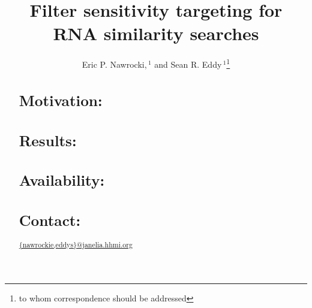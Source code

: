 \documentclass{bioinfo}
\begin{document}

\title[Filter sensitivity targeting]{Filter sensitivity targeting
  for RNA similarity searches}
\author[E. Nawrocki and S. Eddy]{Eric P. Nawrocki,\,$^1$ and Sean R. Eddy\,$^1$\footnote{to whom correspondence should be addressed}}
\address{$^{1}$HHMI Janelia Farm Research Campus, Ashburn VA 20147, USA\\}



\maketitle

\begin{abstract}
\section{Motivation:}

\section{Results:}

\section{Availability:}

\section{Contact:} \url{{nawrockie,eddys}@janelia.hhmi.org}
\end{abstract}



\end{document}
